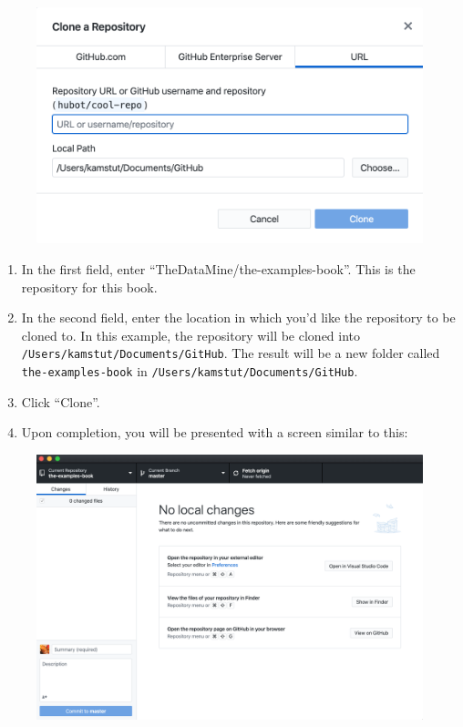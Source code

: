 \documentclass[]{book}
\providecommand{\tightlist}{%
  \setlength{\itemsep}{0pt}\setlength{\parskip}{0pt}}
\begin{document}
\begin{figure}
\centering
\includegraphics{./images/gh-desktop-04.png}
\caption{}
\end{figure}

\begin{enumerate}
\def\labelenumi{\arabic{enumi}.}
\setcounter{enumi}{3}
\tightlist
\item
  In the first field, enter ``TheDataMine/the-examples-book''. This is
  the repository for this book.
\item
  In the second field, enter the location in which you'd like the
  repository to be cloned to. In this example, the repository will be
  cloned into \texttt{/Users/kamstut/Documents/GitHub}. The result will
  be a new folder called \texttt{the-examples-book} in
  \texttt{/Users/kamstut/Documents/GitHub}.
\item
  Click ``Clone''.
\item
  Upon completion, you will be presented with a screen similar to this:
\end{enumerate}

\begin{figure}
\centering
\includegraphics{./images/gh-desktop-05.png}
\caption{}
\end{figure}
\end{document}
